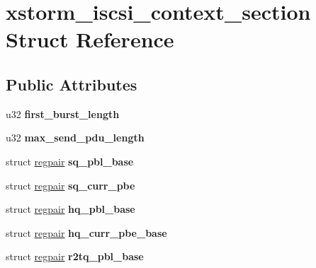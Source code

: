 \hypertarget{structxstorm__iscsi__context__section}{
\section{xstorm\_\-iscsi\_\-context\_\-section Struct Reference}
\label{structxstorm__iscsi__context__section}
}
\subsection*{Public Attributes}
\begin{DoxyCompactItemize}
\item 
\hypertarget{structxstorm__iscsi__context__section_a794311464cf82cf9fa3f65ce92e5c1f7}{
u32 {\bfseries first\_\-burst\_\-length}}
\label{structxstorm__iscsi__context__section_a794311464cf82cf9fa3f65ce92e5c1f7}

\item 
\hypertarget{structxstorm__iscsi__context__section_a928104e82ef14156f2fc2f714849e4a7}{
u32 {\bfseries max\_\-send\_\-pdu\_\-length}}
\label{structxstorm__iscsi__context__section_a928104e82ef14156f2fc2f714849e4a7}

\item 
\hypertarget{structxstorm__iscsi__context__section_a162ddfac6cacbd2707a58cb05dc8c343}{
struct \hyperlink{structregpair}{regpair} {\bfseries sq\_\-pbl\_\-base}}
\label{structxstorm__iscsi__context__section_a162ddfac6cacbd2707a58cb05dc8c343}

\item 
\hypertarget{structxstorm__iscsi__context__section_ae180464dd298e30263d3b595a50b6877}{
struct \hyperlink{structregpair}{regpair} {\bfseries sq\_\-curr\_\-pbe}}
\label{structxstorm__iscsi__context__section_ae180464dd298e30263d3b595a50b6877}

\item 
\hypertarget{structxstorm__iscsi__context__section_aa034ef5310caebf9fe8555b0fc8ffe23}{
struct \hyperlink{structregpair}{regpair} {\bfseries hq\_\-pbl\_\-base}}
\label{structxstorm__iscsi__context__section_aa034ef5310caebf9fe8555b0fc8ffe23}

\item 
\hypertarget{structxstorm__iscsi__context__section_a470a0409e654eb8017c81960bc7bff29}{
struct \hyperlink{structregpair}{regpair} {\bfseries hq\_\-curr\_\-pbe\_\-base}}
\label{structxstorm__iscsi__context__section_a470a0409e654eb8017c81960bc7bff29}

\item 
\hypertarget{structxstorm__iscsi__context__section_aa9e40cf230b4b5798f886247d56b1c37}{
struct \hyperlink{structregpair}{regpair} {\bfseries r2tq\_\-pbl\_\-base}}
\label{structxstorm__iscsi__context__section_aa9e40cf230b4b5798f886247d56b1c37}


\end{DoxyCompactItemize}

